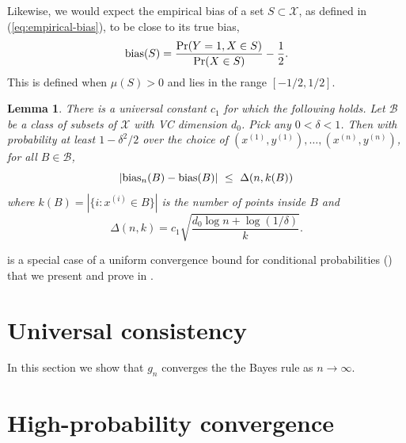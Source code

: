 \documentclass{article}
\def\pr{{\rm Pr}}
\def\X{{\mathcal X}}
\def\B{{\mathcal B}}
\def\bias{{\rm bias}}
\newtheorem{lemma}[theorem]{Lemma}
\begin{document}
Likewise, we would expect the empirical bias of a set $S \subset \X$, as defined in (\ref{eq:empirical-bias}), to be close to its true bias,
$$ \bias(S) = \frac{\pr(Y = 1, X \in S)}{\pr(X \in S)} - \frac{1}{2} .$$
This is defined when $\mu(S) > 0$ and lies in the range $[-1/2,1/2]$.

\begin{lemma}
There is a universal constant $c_1$ for which the following holds. Let $\B$ be a class of subsets of $\X$ with VC dimension $d_0$. Pick any $0 < \delta < 1$. Then with probability at least $1-\delta^2/2$ over the choice of $(x^{(1)}, y^{(1)}), \ldots, (x^{(n)}, y^{(n)})$, for all $B \in \B$,
  $$ \left| \bias_n(B) - \bias(B) \right| \ \leq \ \Delta(n, k(B)) $$
where $k(B) = |\{i: x^{(i)} \in B\}|$ is the number of points inside $B$ and 
\begin{equation}
\Delta(n,k) = c_1 \sqrt{\frac{d_0 \log n + \log (1/\delta)}{k}} .
\label{eq:delta-defn}
\end{equation}
\label{lemma:bias}
\end{lemma}

 is a special case of a uniform convergence bound for conditional probabilities () 
that we present and prove in .

\section{Universal consistency}
\label{sec:universal-consistency}
In this section we show that $g_n$ converges the the Bayes rule as
$n \to \infty$.
\section{High-probability convergence}
\end{document}
